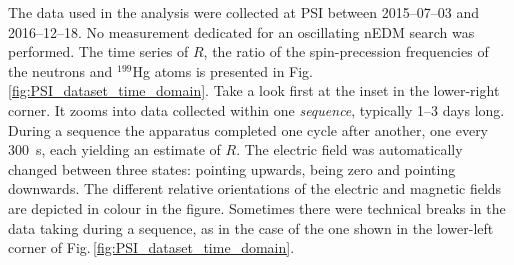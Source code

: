 The data used in the analysis were collected at PSI between 2015--07--03 and 2016--12--18.
No measurement dedicated for an oscillating nEDM search was performed.
The time series of $R$, the ratio of the spin-precession frequencies of the neutrons and ${}^{199}$Hg atoms is presented in Fig.\,\ref{fig:PSI_dataset_time_domain}.
Take a look first at the inset in the lower-right corner.
It zooms into data collected within one \emph{sequence}, typically 1--3 days long.
During a sequence the apparatus completed one cycle after another, one every \SI{300}{\second}, each yielding an estimate of $R$.
The electric field was automatically changed between three states: pointing upwards, being zero and pointing downwards.
The different relative orientations of the electric and magnetic fields are depicted in colour in the figure.
Sometimes there were technical breaks in the data taking during a sequence, as in the case of the one shown in the lower-left corner of Fig.\,\ref{fig:PSI_dataset_time_domain}.


